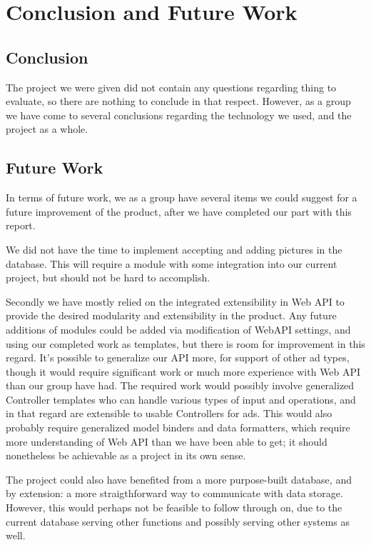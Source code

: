 \chapter{Conclusion and Future Work}

\section{Conclusion}

The project we were given did not contain any questions regarding thing to evaluate, so there are nothing to conclude in that respect. However, as a group we have come to several conclusions regarding the technology we used, and the project as a whole.
\\


\section{Future Work}

In terms of future work, we as a group have several items we could suggest for a future improvement of the product, after we have completed our part with this report.

We did not have the time to implement accepting and adding pictures in the database. This will require a module with some integration into our current project, but should not be
hard to accomplish.

Secondly we have mostly relied on the integrated extensibility in Web API to provide the desired modularity and extensibility in the product. Any future additions of modules could be
added via modification of WebAPI settings, and using our completed work as templates, but there is room for improvement in this regard. It's possible to generalize our API more, for support
of other ad types, though it would require significant work or much more experience with Web API than our group have had. The required work would possibly involve generalized Controller templates
who can handle various types of input and operations, and in that regard are extensible to usable Controllers for ads. This would also probably require generalized model binders and data formatters, which require more understanding of Web API than we have been able to get; it should nonetheless be achievable as a project in its own sense.

The project could also have benefited from a more purpose-built database, and by extension: a more straigthforward way to communicate with data storage. However, this would perhaps not be feasible to follow through on, due to the current database serving other functions and possibly serving other systems as well.
